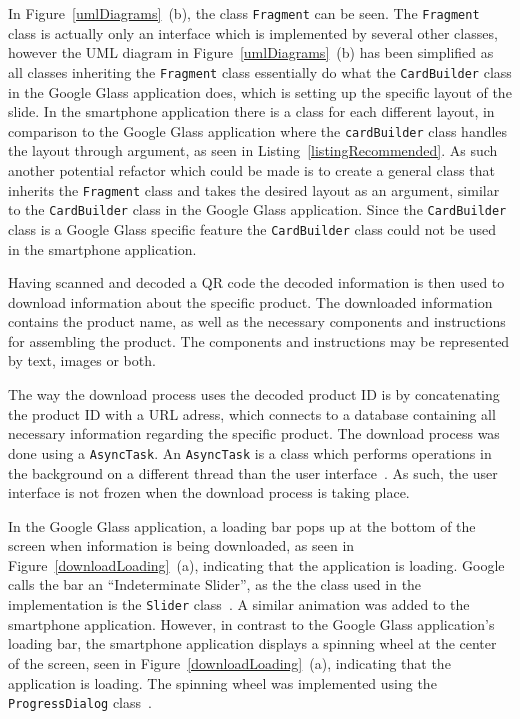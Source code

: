 In Figure~\ref{umlDiagrams}~(b), the class \texttt{Fragment} can be seen. The \texttt{Fragment} class is actually only an interface which is implemented by several other classes, however the UML diagram in Figure~\ref{umlDiagrams}~(b) has been simplified as all classes inheriting the \texttt{Fragment} class essentially do what the \texttt{CardBuilder} class in the Google Glass application does, which is setting up the specific layout of the slide. In the smartphone application there is a class for each different layout, in comparison to the Google Glass application where the \texttt{cardBuilder} class handles the layout through argument, as seen in Listing~\ref{listingRecommended}. As such another potential refactor which could be made is to create a general class that inherits the \texttt{Fragment} class and takes the desired layout as an argument, similar to the \texttt{CardBuilder} class in the Google Glass application. Since the \texttt{CardBuilder} class is a Google Glass specific feature the \texttt{CardBuilder} class could not be used in the smartphone application.



Having scanned and decoded a QR code the decoded information is then used to download information about the specific product. The downloaded information contains the product name, as well as the necessary components and instructions for assembling the product. The components and instructions may be represented by text, images or both. 

The way the download process uses the decoded product ID is by concatenating the product ID with a URL adress, which connects to a database containing all necessary information regarding the specific product. The download process was done using a \texttt{AsyncTask}. An \texttt{AsyncTask} is a class which performs operations in the background on a different thread than the user interface~\cite{asyncTask}. As such, the user interface is not frozen when the download process is taking place.

In the Google Glass application, a loading bar pops up at the bottom of the screen when information is being downloaded, as seen in Figure~\ref{downloadLoading}~(a), indicating that the application is loading. Google calls the bar an ``Indeterminate Slider'', as the the class used in the implementation is the \texttt{Slider} class~\cite{indeterminateSlide}. A similar animation was added to the smartphone application. However, in contrast to the Google Glass application's loading bar, the smartphone application displays a spinning wheel at the center of the screen, seen in Figure~\ref{downloadLoading}~(a), indicating that the application is loading. The spinning wheel was implemented using the \texttt{ProgressDialog} class~\cite{loadingWheel}.

